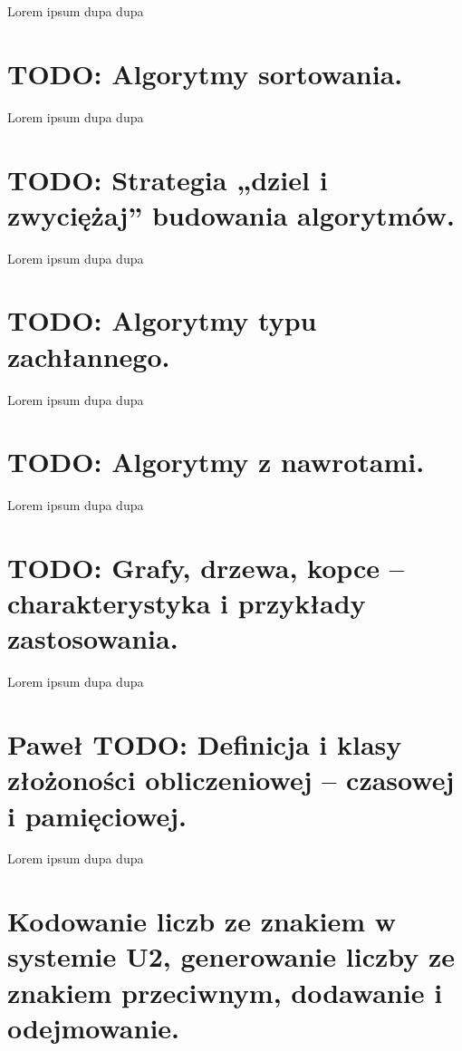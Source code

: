 \documentclass[a4paper,12pt,oneside]{book}
\begin{document}
		    Lorem ipsum dupa dupa
		
		\setcounter{section}{17}
		\section{\color{red} TODO: Algorytmy sortowania. }
		    
		    Lorem ipsum dupa dupa
		
		
		\setcounter{section}{18}
		\section{\color{red} TODO: Strategia „dziel i zwyciężaj” budowania algorytmów. }
		    
		    Lorem ipsum dupa dupa
		
		\setcounter{section}{19}
		\section{\color{red} TODO: Algorytmy typu zachłannego. }
		    
		    Lorem ipsum dupa dupa
		
		\setcounter{section}{20}
		\section{\color{red} TODO: Algorytmy z nawrotami. }
		    
		    Lorem ipsum dupa dupa
		
		\setcounter{section}{21}
		\section{\color{red} TODO: Grafy, drzewa, kopce – charakterystyka i przykłady zastosowania. }
		    
		    Lorem ipsum dupa dupa
		
		\setcounter{section}{46}
		\section{\color{green}Paweł \color{red} TODO: Definicja i klasy złożoności obliczeniowej – czasowej i pamięciowej. }
		    
		    Lorem ipsum dupa dupa
		
		\setcounter{section}{55}
		\section{Kodowanie liczb ze znakiem w systemie U2, generowanie liczby ze znakiem przeciwnym, dodawanie i odejmowanie. }
		
\end{document}
